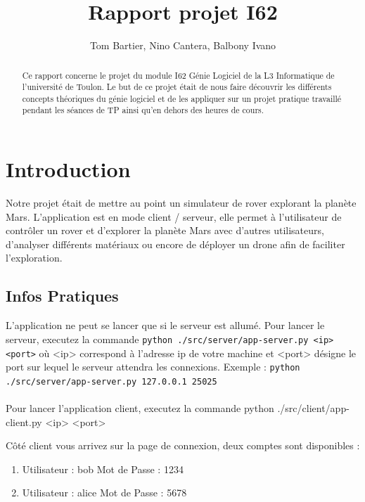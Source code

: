 \documentclass[12pt,a4paper]{scrartcl}
\title{Rapport projet I62}
\author{Tom Bartier, Nino Cantera, Balbony Ivano}
\begin{document}
\pagestyle{fancy}
\fancyhead{} %

\maketitle


\begin{abstract}
Ce rapport concerne le projet du module I62 Génie Logiciel de la L3 Informatique
de l'université de Toulon. Le but de ce projet était de nous faire découvrir
les différents concepts théoriques du génie logiciel et de les appliquer sur un projet 
pratique travaillé pendant les séances de TP ainsi qu'en dehors des heures de cours.
\end{abstract}

\tableofcontents

\section {Introduction}

Notre projet était de mettre au point un simulateur de rover explorant la planète Mars.
L'application est en mode client / serveur, elle permet à l'utilisateur de contrôler un rover
et d'explorer la planète Mars avec d'autres utilisateurs, d'analyser différents matériaux
ou encore de déployer un drone afin de faciliter l'exploration.

\subsection{Infos Pratiques}
L'application ne peut se lancer que si le serveur est allumé. 
Pour lancer le serveur, executez la commande \lstinline!python ./src/server/app-server.py <ip> <port>!
où <ip> correspond à l'adresse ip de votre machine et <port> désigne le port sur lequel le
serveur attendra les connexions. Exemple : \lstinline!python ./src/server/app-server.py 127.0.0.1 25025! \\\\
Pour lancer l'application client, executez la commande python ./src/client/app-client.py <ip> <port>

Côté client vous arrivez sur la page de connexion, deux comptes sont disponibles :
\begin{enumerate}
    \item Utilisateur : bob     Mot de Passe : 1234
    \item Utilisateur : alice   Mot de Passe : 5678
\end{enumerate}
\end{document}
